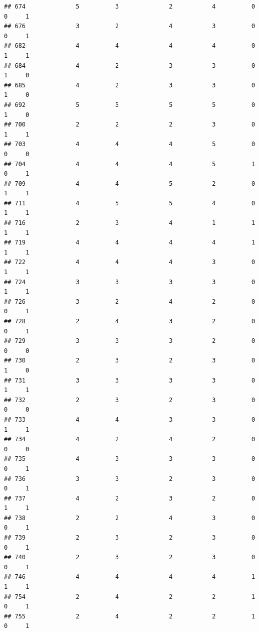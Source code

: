 \documentclass[
]{article}
\begin{document}
\begin{verbatim}
## 674              5          3              2           4          0    0     1
## 676              3          2              4           3          0    0     1
## 682              4          4              4           4          0    1     1
## 684              4          2              3           3          0    1     0
## 685              4          2              3           3          0    1     0
## 692              5          5              5           5          0    1     0
## 700              2          2              2           3          0    1     1
## 703              4          4              4           5          0    0     0
## 704              4          4              4           5          1    0     1
## 709              4          4              5           2          0    1     1
## 711              4          5              5           4          0    1     1
## 716              2          3              4           1          1    1     1
## 719              4          4              4           4          1    1     1
## 722              4          4              4           3          0    1     1
## 724              3          3              3           3          0    1     1
## 726              3          2              4           2          0    0     1
## 728              2          4              3           2          0    0     1
## 729              3          3              3           2          0    0     0
## 730              2          3              2           3          0    1     0
## 731              3          3              3           3          0    1     1
## 732              2          3              2           3          0    0     0
## 733              4          4              3           3          0    1     1
## 734              4          2              4           2          0    0     0
## 735              4          3              3           3          0    0     1
## 736              3          3              2           3          0    0     1
## 737              4          2              3           2          0    1     1
## 738              2          2              4           3          0    0     1
## 739              2          3              2           3          0    0     1
## 740              2          3              2           3          0    0     1
## 746              4          4              4           4          1    1     1
## 754              2          4              2           2          1    0     1
## 755              2          4              2           2          1    0     1

\end{verbatim}
\end{document}
